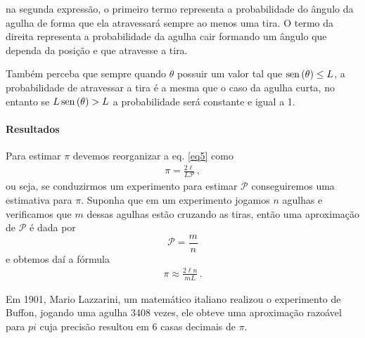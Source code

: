 \documentclass[18pt]{article}
\begin{document}
na segunda expressão, o primeiro termo representa a probabilidade do ângulo da agulha de forma que ela atravessará sempre ao menos uma tira. O termo da direita representa a probabilidade da agulha cair formando um ângulo que dependa da posição e que atravesse a tira.

Também perceba que sempre quando $\theta$ possuir um valor tal que $\operatorname{sen}\left(\theta\right)\leq L$, a probabilidade de atravessar a tira é a mesma que o caso da agulha curta, no entanto se $L\operatorname{sen}\left(\theta\right)> L$ a probabilidade será constante e igual a 1.

\paragraph{Resultados}

Para estimar $\pi$ devemos reorganizar a eq. \ref{eq5} como
\begin{align*}
\pi=\frac{2\ell}{L\mathcal{P}}\,,
\end{align*}
ou seja, se conduzirmos um experimento para estimar $\mathcal{P}$ conseguiremos uma estimativa para $\pi$. Suponha que em um experimento jogamos $n$ agulhas e verificamos que $m$ dessas agulhas estão cruzando as tiras, então uma aproximação de $\mathcal{P}$ é dada por $$\mathcal{P}=\frac{m}{n}$$ e obtemos daí a fórmula \begin{align}
\pi\approx\frac{2\ell n}{mL}\,.
\end{align}


Em 1901, Mario Lazzarini, um matemático italiano realizou o experimento de Buffon, jogando uma agulha 3408 vezes, ele obteve uma aproximação razoável para $pi$ cuja precisão resultou em 6 casas decimais de $\pi$.
\bigbreak
	
	
	
\end{document}
